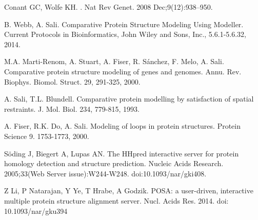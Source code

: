 \documentclass[10pt,letterpaper]{article}
\begin{document}
\nolinenumbers

%
%
% 
\begin{thebibliography}{10}

Conant GC, Wolfe KH.
.
\newblock Nat Rev Genet. 2008 Dec;9(12):938--950.

B. Webb, A. Sali.
\newblock Comparative Protein Structure Modeling Using Modeller.
\newblock Current Protocols in Bioinformatics, John Wiley and Sons, Inc., 5.6.1-5.6.32, 2014.

M.A. Marti-Renom, A. Stuart, A. Fiser, R. Sánchez, F. Melo, A. Sali. 
\newblock Comparative protein structure modeling of genes and genomes.
\newblock Annu. Rev. Biophys. Biomol. Struct. 29, 291-325, 2000.

A. Sali, T.L. Blundell.
\newblock Comparative protein modelling by satisfaction of spatial restraints.
\newblock J. Mol. Biol. 234, 779-815, 1993.

A. Fiser, R.K. Do, A. Sali.
\newblock Modeling of loops in protein structures.
\newblock Protein Science 9. 1753-1773, 2000.

Söding J, Biegert A, Lupas AN.
\newblock The HHpred interactive server for protein homology detection and structure prediction. 
\newblock Nucleic Acids Research. 2005;33(Web Server issue):W244-W248. doi:10.1093/nar/gki408.

Z Li, P Natarajan, Y Ye, T Hrabe, A Godzik.
\newblock POSA: a user-driven, interactive multiple protein structure alignment server.
\newblock Nucl. Acids Res. 2014. doi: 10.1093/nar/gku394

\end{thebibliography}
\end{document}
